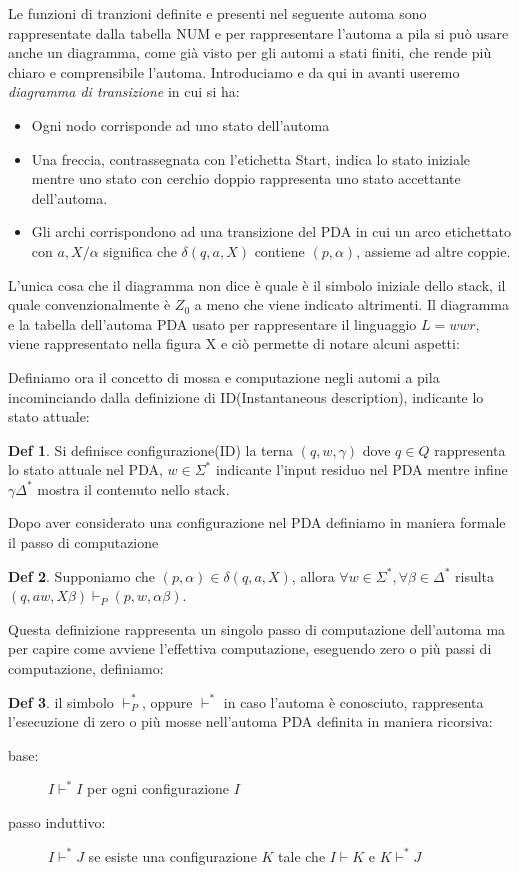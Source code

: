 \documentclass[a4paper]{book}
\theoremstyle{definition}%
\newtheorem*{defi}{Def}%
\begin{document}
  Le funzioni di tranzioni definite e presenti nel seguente automa sono rappresentate
  dalla tabella NUM e per rappresentare l'automa a pila si può usare anche un diagramma,
   come già visto per gli automi a stati finiti, che rende più chiaro e comprensibile l'automa.\newline
  Introduciamo e da qui in avanti useremo \emph{diagramma di transizione} in cui si ha:
  \begin{itemize}
  \item Ogni nodo corrisponde ad uno stato dell'automa
  \item Una freccia, contrassegnata con l'etichetta Start, indica lo stato iniziale
   mentre uno stato con cerchio doppio rappresenta uno stato accettante dell'automa.
  \item Gli archi corrispondono ad una transizione del PDA in cui un arco etichettato
   con $a,X / \alpha$ significa che $\delta(q,a,X)$ contiene $(p,\alpha)$, assieme ad altre coppie.
  \end{itemize}
  L'unica cosa che il diagramma non dice è quale è il simbolo iniziale dello stack,
  il quale convenzionalmente è $Z_0$ a meno che viene indicato altrimenti.\newline
  Il diagramma e la tabella dell'automa PDA usato per rappresentare il linguaggio $L = wwr$,
  viene rappresentato nella figura X e ciò permette di notare alcuni aspetti:

Definiamo ora il concetto di mossa e computazione negli automi a pila incominciando
dalla definizione di ID(Instantaneous description), indicante lo stato attuale:
\begin{defi}
Si definisce configurazione(ID) la terna $(q, w, \gamma)$ dove $q \in Q$ rappresenta
    lo stato attuale nel PDA, $w \in \Sigma ^ *$ indicante l'input residuo nel PDA
    mentre infine $\gamma \Delta ^ *$ mostra il contenuto nello stack.
 \end{defi}
 Dopo aver considerato una configurazione nel PDA definiamo in maniera formale il passo di computazione
 \begin{defi}
   Supponiamo che $(p, \alpha) \in \delta(q, a, X)$, allora $\forall w \in \Sigma ^ *, \forall \beta \in \Delta ^ *$
   risulta $(q, aw, X \beta) \vdash _P(p, w, \alpha \beta)$.
 \end{defi}
 Questa definizione rappresenta un singolo passo di computazione dell'automa ma per
 capire come avviene l'effettiva computazione, eseguendo zero o più passi di computazione, definiamo:
 \begin{defi}
   il simbolo $\vdash ^ * _ P$, oppure $\vdash ^ *$ in caso l'automa è conosciuto,
   rappresenta l'esecuzione di zero o più mosse nell'automa PDA definita in maniera ricorsiva:
   \begin{description}
     \item [base:] $I \vdash ^ * I$ per ogni configurazione $I$
     \item [passo induttivo:] $I \vdash ^ * J$ se esiste una configurazione $K$ tale che
                              $I \vdash K$ e $K \vdash ^* J$
   \end{description}
 \end{defi}
\end{document}

